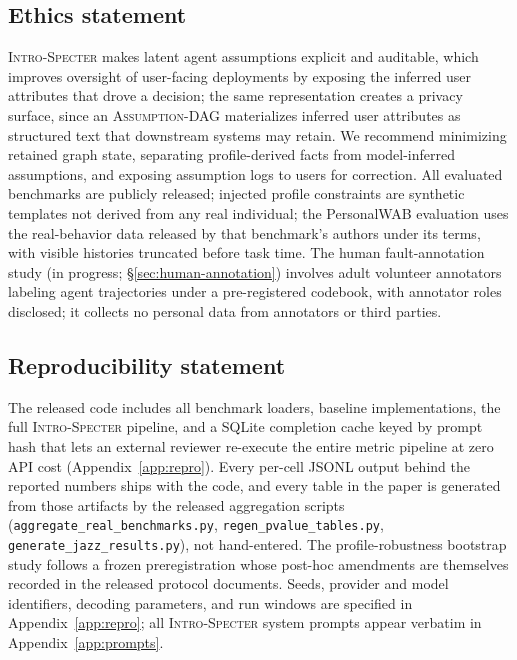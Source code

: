 \documentclass{article}
\newcommand{\method}{\textsc{Intro-Specter}\xspace}
\newcommand{\dagg}{\textsc{Assumption-DAG}\xspace}
\begin{document}
\subsection*{Ethics statement}

\method makes latent agent assumptions explicit and auditable, which improves oversight of user-facing deployments by exposing the inferred user attributes that drove a decision; the same representation creates a privacy surface, since an \dagg materializes inferred user attributes as structured text that downstream systems may retain. We recommend minimizing retained graph state, separating profile-derived facts from model-inferred assumptions, and exposing assumption logs to users for correction. All evaluated benchmarks are publicly released; injected profile constraints are synthetic templates not derived from any real individual; the PersonalWAB evaluation uses the real-behavior data released by that benchmark's authors under its terms, with visible histories truncated before task time. The human fault-annotation study (in progress; \S\ref{sec:human-annotation}) involves adult volunteer annotators labeling agent trajectories under a pre-registered codebook, with annotator roles disclosed; it collects no personal data from annotators or third parties.

\subsection*{Reproducibility statement}

The released code includes all benchmark loaders, baseline implementations, the full \method pipeline, and a SQLite completion cache keyed by prompt hash that lets an external reviewer re-execute the entire metric pipeline at zero API cost (Appendix~\ref{app:repro}). Every per-cell JSONL output behind the reported numbers ships with the code, and every table in the paper is generated from those artifacts by the released aggregation scripts (\texttt{aggregate\_real\_benchmarks.py}, \texttt{regen\_pvalue\_tables.py}, \texttt{generate\_jazz\_results.py}), not hand-entered. The profile-robustness bootstrap study follows a frozen preregistration whose post-hoc amendments are themselves recorded in the released protocol documents. Seeds, provider and model identifiers, decoding parameters, and run windows are specified in Appendix~\ref{app:repro}; all \method system prompts appear verbatim in Appendix~\ref{app:prompts}.
\end{document}
